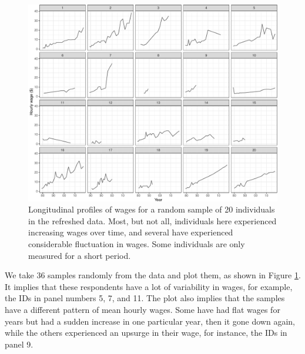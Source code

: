 \documentclass[12pt]{article}
\begin{document}
\begin{figure}

{\centering \includegraphics[width=1\linewidth]{figures/sample-plot-1} 

}

\caption{Longitudinal profiles of wages for a random sample of 20 individuals in the refreshed data. Most, but not all, individuals here experienced increasing wages over time, and several have experienced considerable fluctuation in wages. Some individuals are only measured for a short period.}\label{fig:sample-plot}
\end{figure}

We take 36 samples randomly from the data and plot them, as shown in Figure \ref{fig:sample-plot}. It implies that these respondents have a lot of variability in wages, for example, the IDs in panel numbers 5, 7, and 11. The plot also implies that the samples have a different pattern of mean hourly wages. Some have had flat wages for years but had a sudden increase in one particular year, then it gone down again, while the others experienced an upsurge in their wage, for instance, the IDs in panel 9.
\end{document}
